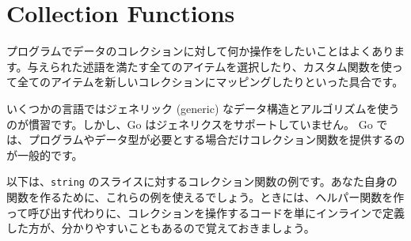 \section{Collection Functions}

プログラムでデータのコレクションに対して何か操作をしたいことはよくあります。与えられた述語を満たす全てのアイテムを選択したり、カスタム関数を使って全てのアイテムを新しいコレクションにマッピングしたりといった具合です。

いくつかの言語ではジェネリック (generic) なデータ構造とアルゴリズムを使うのが慣習です。しかし、Go はジェネリクスをサポートしていません。 Go では、プログラムやデータ型が必要とする場合だけコレクション関数を提供するのが一般的です。

以下は、\texttt{string} のスライスに対するコレクション関数の例です。あなた自身の関数を作るために、これらの例を使えるでしょう。ときには、ヘルパー関数を作って呼び出す代わりに、コレクションを操作するコードを単にインラインで定義した方が、分かりやすいこともあるので覚えておきましょう。





